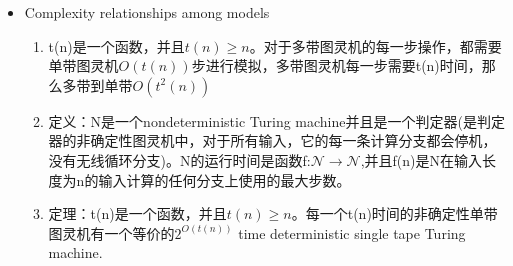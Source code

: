 \documentclass[UTF8]{ctexart}
\begin{document}
\begin{itemize}
\begin{enumerate}
\begin{itemize}
            \item 因此该图灵机是$O(n^2)$的时间复杂度。
        \end{itemize}
        \item 定义：t函数是$\mathcal{N} \to \mathcal{R} ^{+}$的映射。定义time complexity class时间复杂度类，TIME(t(n))定义为所有在$O(t(n))$时间图灵机可判定的所有语言集合。
        \item 发现：对于识别语言A的时间复杂度，依赖于计算模型的选择。
    \end{enumerate}
    \item Complexity relationships among models
    \begin{enumerate}
        \item t(n)是一个函数，并且$t(n)\geqslant n$。对于多带图灵机的每一步操作，都需要单带图灵机$O(t(n))$步进行模拟，多带图灵机每一步需要t(n)时间，那么多带到单带$O(t^2(n))$
        \item 定义：N是一个nondeterministic Turing machine并且是一个判定器(是判定器的非确定性图灵机中，对于所有输入，它的每一条计算分支都会停机，没有无线循环分支)。N的运行时间是函数f:$\mathcal{N} \to \mathcal{N}$,并且f(n)是N在输入长度为n的输入计算的任何分支上使用的最大步数。
        \item 定理：t(n)是一个函数，并且$t(n)\geqslant n$。每一个t(n)时间的非确定性单带图灵机有一个等价的$2^{O(t(n))}$ time deterministic single tape Turing machine.
    \end{enumerate}
\end{itemize}
\end{document}
